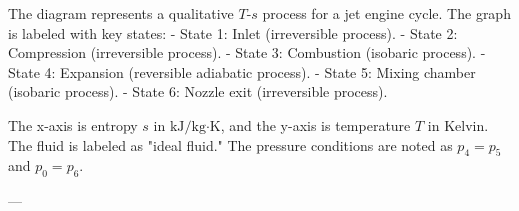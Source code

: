 The diagram represents a qualitative \( T \)-\( s \) process for a jet engine cycle. The graph is labeled with key states:  
- State 1: Inlet (irreversible process).  
- State 2: Compression (irreversible process).  
- State 3: Combustion (isobaric process).  
- State 4: Expansion (reversible adiabatic process).  
- State 5: Mixing chamber (isobaric process).  
- State 6: Nozzle exit (irreversible process).  

The x-axis is entropy \( s \) in \( \text{kJ}/\text{kg·K} \), and the y-axis is temperature \( T \) in Kelvin. The fluid is labeled as "ideal fluid." The pressure conditions are noted as \( p_4 = p_5 \) and \( p_0 = p_6 \).  

---